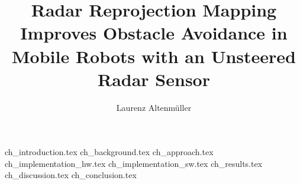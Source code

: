 \documentclass[%
    fontsize=12pt,
    headinclude,
    paper=a4,
    numbers=noenddot,
    listof=totoc,
    bibliography=totoc,
    index=totoc,
]{diplomarbeit}
\title{Radar Reprojection Mapping Improves Obstacle Avoidance in Mobile Robots with an Unsteered Radar Sensor}
\author{Laurenz Altenmüller}
\begin{document}
\maketitle

\renewcommand{\thepage}{}
\cleardoublepage 



\pagestyle{empty}
\cleardoublepage 
\setcounter{page}{3}	%
\renewcommand{\thepage}{\roman{page}}

\pagestyle{headings}
\tableofcontents





\newpage{\pagestyle{plain}\cleardoublepage}
\rmfamily
\renewcommand{\thepage}{\arabic{page}}
\setcounter{page}{1}

{ch_introduction.tex}
{ch_background.tex}
{ch_approach.tex}
{ch_implementation_hw.tex}
{ch_implementation_sw.tex}
{ch_results.tex}
{ch_discussion.tex}
{ch_conclusion.tex}


\clearpage
\begin{appendix}





\end{appendix}

\listoffigures
\listoftables

\clearpage
\printindex

\clearpage
\printbibliography
\end{document}

